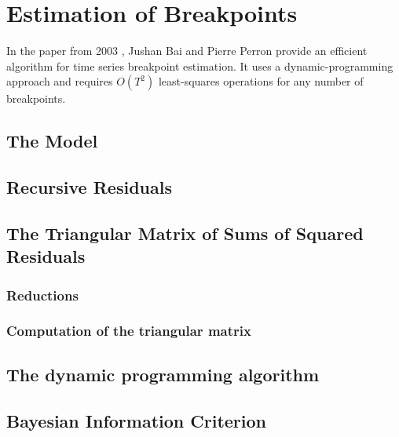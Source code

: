 \documentclass[main.tex]{subfiles}
\begin{document}
\chapter{Estimation of Breakpoints}
\label{chap:estimation_of_breakpoints}
In the paper from 2003 \cite{bai_perron}, Jushan Bai and Pierre Perron provide an
efficient algorithm for time series breakpoint estimation. It uses a dynamic-programming
approach and requires $O(T^2)$ least-squares operations for any number of breakpoints.

\section{The Model}
\label{sec:breakpoints_the_model}

\section{Recursive Residuals}
\label{sec:recursive_residuals}

\section{The Triangular Matrix of Sums of Squared Residuals}
\label{sec:triangular_matrix}
\subsection{Reductions}
\subsection{Computation of the triangular matrix}

\section{The dynamic programming algorithm}
\label{sec:dynamic_algorithm}

\section{Bayesian Information Criterion}
\label{sec:bayesian_information_criterion}
\cite{schwarz1978}
\end{document}
